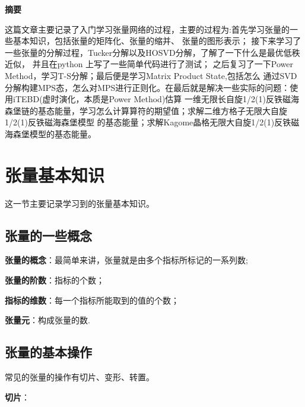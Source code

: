 \documentclass{uofa-eng-assignment}
\begin{document}
\maketitle
\begin{center}
    \textbf{\Large 摘要}
\end{center}
    \qquad 这篇文章主要记录了入门学习张量网络的过程，主要的过程为:首先学习张量的一些基本知识，包括张量的矩阵化、张量的缩并、
    张量的图形表示； 接下来学习了一些张量的分解过程，Tucker分解以及HOSVD分解，了解了一下什么是最优低秩近似， 并且在python
    上写了一些简单代码进行了测试； 之后复习了一下Power Method，学习T-S分解；最后便是学习Matrix Product State,包括怎么
    通过SVD分解构建MPS态，怎么对MPS进行正则化。在最后就是解决一些实际的问题：使用iTEBD(虚时演化，本质是Power Method)估算
    一维无限长自旋1/2(1)反铁磁海森堡链的基态能量，学习怎么计算算符的期望值；求解二维方格子无限大自旋1/2(1)反铁磁海森堡模型
    的基态能量；求解Kagome晶格无限大自旋1/2(1)反铁磁海森堡模型的基态能量。

\section[Tensor]{张量基本知识}\label{sec:Tensor}
    这一节主要记录学习到的张量基本知识。
    \subsection[Tenser Size]{张量的一些概念}\label{subsec:Size}
        \textbf{张量的概念}：最简单来讲，张量就是由多个指标所标记的一系列数;

        \textbf{张量的阶数}：指标的个数；

        \textbf{指标的维数}：每一个指标所能取到的值的个数；
    
        \textbf{张量元}：构成张量的数.
    \subsection[Tensor Operator]{张量的基本操作}\label{subsec:operator}
        常见的张量的操作有切片、变形、转置。

        \textbf{切片}：
\end{document}
